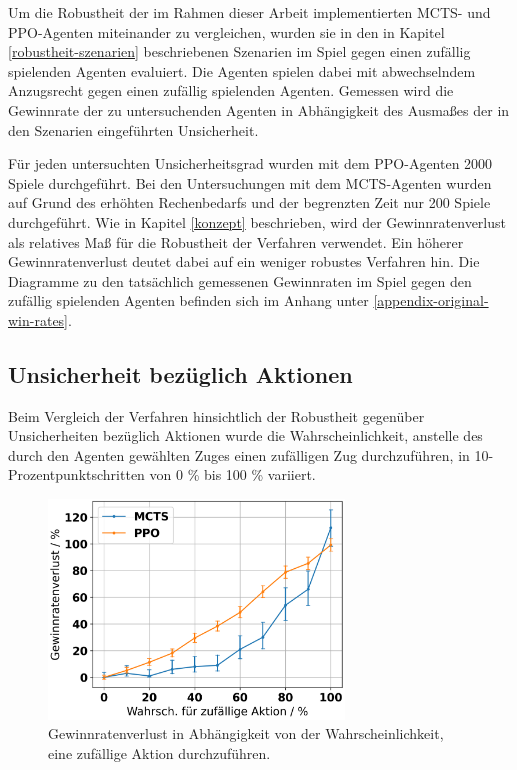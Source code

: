 Um die Robustheit der im Rahmen dieser Arbeit implementierten MCTS- und PPO-Agenten miteinander zu vergleichen, wurden sie in den in Kapitel \ref{robustheit-szenarien} beschriebenen Szenarien im Spiel gegen einen zufällig spielenden Agenten evaluiert. Die Agenten spielen dabei mit abwechselndem Anzugsrecht gegen einen zufällig spielenden Agenten. Gemessen wird die Gewinnrate der zu untersuchenden Agenten in Abhängigkeit des Ausmaßes der in den Szenarien eingeführten Unsicherheit.

Für jeden untersuchten Unsicherheitsgrad wurden mit dem PPO-Agenten 2000 Spiele durchgeführt. Bei den Untersuchungen mit dem MCTS-Agenten wurden auf Grund des erhöhten Rechenbedarfs und der begrenzten Zeit nur 200 Spiele durchgeführt. Wie in Kapitel \ref{konzept} beschrieben, wird der Gewinnratenverlust als relatives Maß für die Robustheit der Verfahren verwendet. Ein höherer Gewinnratenverlust deutet dabei auf ein weniger robustes Verfahren hin. Die Diagramme zu den tatsächlich gemessenen Gewinnraten im Spiel gegen den zufällig spielenden Agenten befinden sich im Anhang unter \ref{appendix-original-win-rates}.

\subsection{Unsicherheit bezüglich Aktionen}

\label{uncertain-actions-result}

Beim Vergleich der Verfahren hinsichtlich der Robustheit gegenüber Unsicherheiten bezüglich Aktionen wurde die Wahrscheinlichkeit, anstelle des durch den Agenten gewählten Zuges einen zufälligen Zug durchzuführen, in 10-Prozentpunktschritten von 0 \% bis 100 \% variiert.

\begin{figure}[ht!]%
	\includegraphics[width=0.7\textwidth, center]{Bilder/robustness-results/uncertain_actions_win_rate_losses.png}
	\caption{Gewinnratenverlust in Abhängigkeit von der Wahrscheinlichkeit, eine zufällige Aktion durchzuführen.}
\end{figure}

